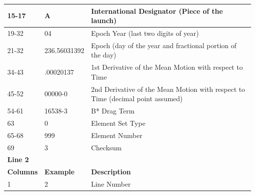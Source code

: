 \documentclass[12pt]{article}
\begin{document}
\begin{table}[h!]
{\begin{tabular}{|l|l|l|}
				15-17                                   & A                                       & International Designator (Piece of the launch)                                  \\ \hline
				19-32                                   & 04                                      & Epoch Year (last two digits of year)                                            \\ \hline
				21-32                                   & 236.56031392                            & Epoch (day of the year and fractional portion of the day)                       \\ \hline
				34-43                                   & .00020137                               & 1st Derivative of the Mean Motion with respect to Time                          \\ \hline
				45-52                                   & 00000-0                                 & 2nd Derivative of the Mean Motion with respect to Time (decimal point assumed)  \\ \hline
				54-61                                   & 16538-3                                 & B* Drag Term                                                                    \\ \hline
				63                                      & 0                                       & Element Set Type                                                                \\ \hline
				65-68                                   & 999                                     & Element Number                                                                  \\ \hline
				69                                      & 3                                       & Checksum                                                                        \\ \hline
				\multicolumn{3}{|l|}{\textbf{Line 2}}                                                                                                                               \\ \hline
				\rowcolor[HTML]{333333} 
				{\color[HTML]{FFFFFF} \textbf{Columns}} & {\color[HTML]{FFFFFF} \textbf{Example}} & {\color[HTML]{FFFFFF} \textbf{Description}}                                     \\ \hline
				1                                       & 2                                       & Line Number                                                                     \\ \hline

\end{tabular}}
\end{table}
\end{document}
